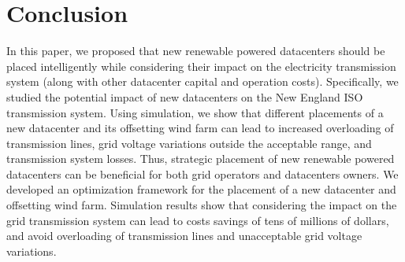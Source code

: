 \section{Conclusion}
\label{sec:conclusion}

In this paper, we proposed that new renewable powered datacenters should be placed intelligently while considering their impact on the electricity transmission system (along with other datacenter capital and operation costs).  Specifically, we studied the potential impact of new datacenters on the New England ISO transmission system.  Using simulation, we show that different placements of a new datacenter and its offsetting wind farm can lead to increased overloading of transmission lines, grid voltage variations outside the acceptable range, and transmission system losses.  Thus, strategic placement of new renewable powered datacenters can be beneficial for both grid operators and datacenters owners.  We developed an optimization framework for the placement of a new datacenter and offsetting wind farm.  Simulation results show that considering the impact on the grid transmission system can lead to costs savings of tens of millions of dollars, and avoid overloading of transmission lines and unacceptable grid voltage variations. 


